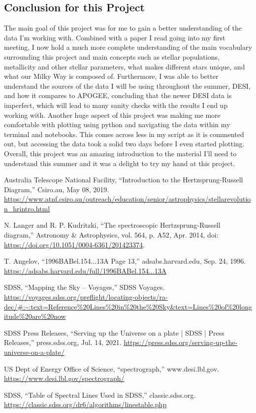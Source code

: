 \documentclass{article}
\begin{document}
\subsection*{Conclusion for this Project}
\indent The main goal of this project was for me to gain a better understanding of the data I’m working with. Combined with a paper I read going into my first meeting, I now hold a much more complete understanding of the main vocabulary surrounding this project and main concepts such as stellar populations, metallicity and other stellar parameters, what makes different stars unique, and what our Milky Way is composed of. Furthermore, I was able to better understand the sources of the data I will be using throughout the summer, DESI, and how it compares to APOGEE, concluding that the newer DESI data is imperfect, which will lead to many sanity checks with the results I end up working with. Another huge aspect of this project was making me more comfortable with plotting using python and navigating the data within my terminal and notebooks. This comes across less in my script as it is commented out, but accessing the data took a solid two days before I even started plotting. Overall, this project was an amazing introduction to the material I’ll need to understand this summer and it was a delight to try my hand at this project.

\newpage

\begin{thebibliography}{99}
    
Australia Telescope National Facility, “Introduction to the Hertzsprung-Russell Diagram,” Csiro.au, May 08, 2019. \url{https://www.atnf.csiro.au/outreach/education/senior/astrophysics/stellarevolution_hrintro.html}

N. Langer and R. P. Kudritzki, “The spectroscopic Hertzsprung-Russell diagram,” Astronomy \& Astrophysics, vol. 564, p. A52, Apr. 2014, doi: \url{https://doi.org/10.1051/0004-6361/201423374}.

T. Angelov, “1996BABel.154...13A Page 13,” adsabs.harvard.edu, Sep. 24, 1996. \url{https://adsabs.harvard.edu/full/1996BABel.154...13A}

SDSS, “Mapping the Sky – Voyages,” SDSS Voyages. \url{https://voyages.sdss.org/preflight/locating-objects/ra-dec/#:~:text=Reference%20Lines%20in%20the%20Sky&text=Lines%20of%20longitude%20are%20now}

SDSS Press Releases, “Serving up the Universe on a plate | SDSS | Press Releases,” press.sdss.org, Jul. 14, 2021. \url{https://press.sdss.org/serving-up-the-universe-on-a-plate/}

US Dept of Energy Office of Science, “spectrograph,” www.desi.lbl.gov. \url{https://www.desi.lbl.gov/spectrograph/}

SDSS, “Table of Spectral Lines Used in SDSS,” classic.sdss.org. \url{https://classic.sdss.org/dr6/algorithms/linestable.php}

\end{thebibliography}
\end{document}
